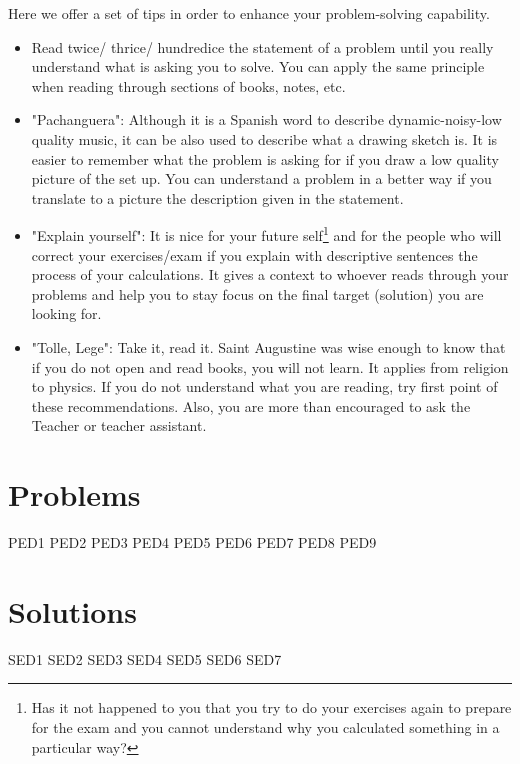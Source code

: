 \documentclass[a4paper,12pt]{article}
\numberwithin{equation}{subsection}
\begin{document}
Here we offer a set of tips in order to enhance your problem-solving capability.

\begin{itemize}
	\item Read twice/ thrice/ hundredice the statement of a problem until you really understand what is asking you to solve. You can apply the same principle when reading through sections of books, notes, etc.
	
	\item "Pachanguera": Although it is a Spanish word to describe dynamic-noisy-low quality music, it can be also used to describe what a drawing sketch is. It is easier to remember what the problem is asking for if you draw a low quality picture of the set up. You can understand a problem in a better way if you translate to a picture the description given in the statement.
	
	\item "Explain yourself": It is nice for your future self\footnote{Has it not happened to you that you try to do your exercises again to prepare for the exam and you cannot understand why you calculated something in a particular way?} and for the people who will correct your exercises/exam if you explain with descriptive sentences the process of your calculations. It gives a context to whoever reads through your problems and help you to stay focus on the final target (solution) you are looking for.
	
	\item "Tolle, Lege": Take it, read it. Saint Augustine was wise enough to know that if you do not open and read books, you will not learn. It applies from religion to physics. If you do not understand what you are reading, try first point of these recommendations. Also, you are more than encouraged to ask the Teacher or teacher assistant.
\end{itemize}

\newpage

\section{Problems}
{PED1}
{PED2}
{PED3}
{PED4}
{PED5}
{PED6}
{PED7}
{PED8}
{PED9}

\section{Solutions}
{SED1}
{SED2}
{SED3}
{SED4}
{SED5}
{SED6}
{SED7}
\end{document}
